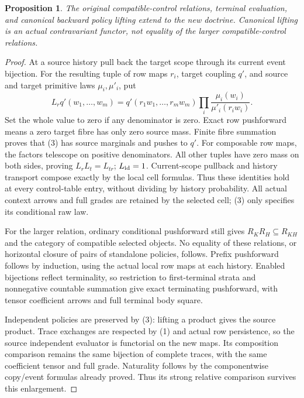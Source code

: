 \documentclass[11pt]{article}
\newtheorem{proposition}[definition]{Proposition}
\begin{document}
\begin{proposition}
The original compatible-control relations, terminal evaluation, and canonical
backward policy lifting extend to the new doctrine. Canonical lifting is an
actual contravariant functor, not equality of the larger compatible-control
relations.
\end{proposition}
\begin{proof}
At a source history pull back the target scope through its current event
bijection. For the resulting tuple of row maps $r_i$, target coupling $q'$,
and source and target primitive laws $\mu_i,\mu'_i$, put
\[
 L_rq'(w_1,\ldots,w_m)=
 q'(r_1w_1,\ldots,r_mw_m)
 \prod_i\frac{\mu_i(w_i)}{\mu'_i(r_iw_i)}.                  \tag{3}
\]
Set the whole value to zero if any denominator is zero.
Exact row pushforward means a zero target fibre has only zero source mass.
Finite fibre summation proves that (3) has source marginals and pushes to
$q'$. For composable row maps, the factors telescope on positive
denominators. All other tuples have zero mass on both sides, proving
$L_rL_t=L_{tr}$; $L_{\rm id}=1$. Current-scope pullback and history transport
compose exactly by the local cell formulas. Thus these identities hold at
every control-table entry, without dividing by history probability.
All actual context arrows and full grades are retained by the selected
cell; (3) only specifies its conditional raw law.

For the larger relation, ordinary conditional pushforward still gives
$R_KR_H\subseteq R_{KH}$ and the category of compatible selected objects.
No equality of these relations, or horizontal closure of pairs of
standalone policies, follows. Prefix pushforward follows by induction,
using the actual local row maps at each history. Enabled bijections reflect
terminality, so restriction to first-terminal strata and nonnegative
countable summation give exact terminating pushforward, with tensor
coefficient arrows and full terminal body square.

Independent policies are preserved by (3): lifting a product gives the
source product. Trace exchanges are respected by (1) and actual row
persistence, so the source independent evaluator is functorial on the new
maps. Its composition comparison remains the same bijection of complete
traces, with the same coefficient tensor and full grade. Naturality follows
by the componentwise copy/event formulas already proved. Thus its strong
relative comparison survives this enlargement.
\end{proof}
\end{document}
